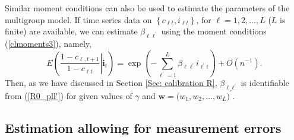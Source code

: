 \documentclass[12pt]{article}
\begin{document}
Similar moment conditions can also be used to estimate the parameters of the
multigroup model. If time series data on $\left\{  c_{\ell t},i_{\ell
t}\right\}  $, for $\ell=1,2,\ldots,L$ ($L$ is finite) are available, we can
estimate $\beta_{\ell\ell^{\prime}}$ using the moment conditions
(\ref{clmoments3}), namely,%
\[
E\left(  \left.  \frac{1-c_{\ell,t+1}}{1-c_{\ell t}}\right\vert \text{
}\mathbf{i}_{t}\right)  =\exp\left(  -\sum_{\ell^{\prime}=1}^{L}\beta
_{\ell\ell^{\prime}}i_{\ell^{\prime}t}\right)  +O\left(  n^{-1}\right)  .
\]
Then, as we have discussed in Section \ref{Sec: calibration R}, $\beta
_{\ell\ell^{\prime}}$ is identifiable from (\ref{R0_pll'}) for given values of
$\gamma$ and $\mathbf{w=(}w_{1},w_{2},\ldots,w_{L})^{\prime}.$

\subsection{Estimation allowing for measurement
errors\label{Sec: estimation R with MF}}
\end{document}
